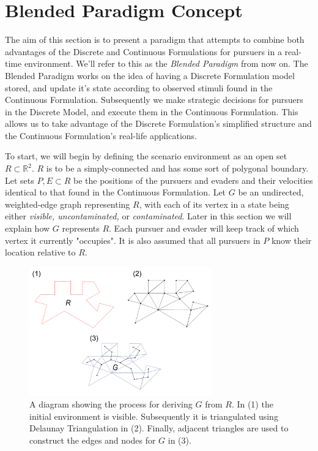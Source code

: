 \documentclass{article}
\begin{document}
\section{Blended Paradigm Concept}
The aim of this section is to present a paradigm that attempts to combine both advantages of the Discrete and Continuous Formulations for pursuers in a real-time environment. We'll refer to this as the \emph{Blended Paradigm} from now on. The Blended Paradigm works on the idea of having a Discrete Formulation model stored, and update it's state according to observed stimuli found in the Continuous Formulation. Subsequently we make strategic decisions for pursuers in the Discrete Model, and execute them in the Continuous Formulation. This allows us to take advantage of the Discrete Formulation's simplified structure and the Continuous Formulation's real-life applications.

To start, we will begin by defining the scenario environment as an open set \(R\subset\mathbb{R}^2\). \(R\) is to be a simply-connected and has some sort of polygonal boundary. Let sets \(P,E\subset{R}\) be the positions of the pursuers and evaders and their velocities identical to that found in the Continuous Formulation. Let \(G\) be an undirected, weighted-edge graph representing \(R\), with each of its vertex in a state being either \emph{visible, uncontaminated,} or \emph{contaminated}. Later in this section we will explain how \(G\) represents \(R\). Each pursuer and evader will keep track of which vertex it currently "occupies". It is also assumed that all pursuers in \(P\) know their location relative to \(R\).

\begin{figure}[htb]
\centering
\includegraphics[width=0.7\textwidth]{"trangulation"}
\caption{A diagram showing the process for deriving \(G\) from \(R\). In (1) the initial environment is visible. Subsequently it is triangulated using Delaunay Triangulation in (2). Finally, adjacent triangles are used to construct the edges and nodes for \(G\) in (3).}
\end{figure}
\end{document}
